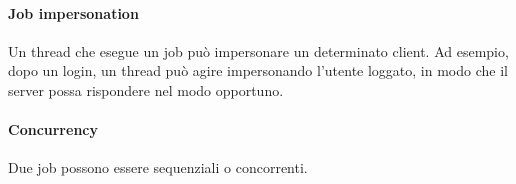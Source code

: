 \paragraph{Job impersonation}
Un thread che esegue un job può impersonare un determinato client.
Ad esempio, dopo un login, un thread può agire impersonando l'utente loggato, 
in modo che il server possa rispondere nel modo opportuno.

\paragraph{Concurrency}
Due job possono essere sequenziali o concorrenti.